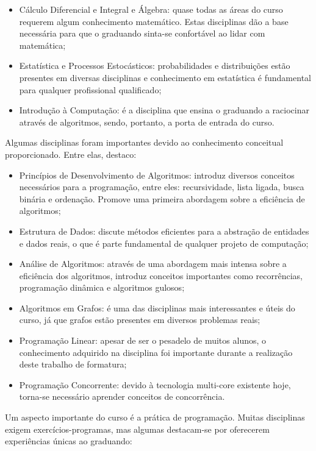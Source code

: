 \begin{itemize}
	\item Cálculo Diferencial e Integral e Álgebra: quase todas as áreas do curso requerem algum
	conhecimento matemático. Estas disciplinas dão a base necessária para que o graduando
	sinta-se confortável ao lidar com matemática;
	\item Estatística e Processos Estocásticos: probabilidades e distribuições estão presentes
	em diversas disciplinas e conhecimento em estatística é fundamental para qualquer
	profissional qualificado;
	\item Introdução à Computação: é a disciplina que ensina o graduando a raciocinar através
	de algoritmos, sendo, portanto, a porta de entrada do curso.
\end{itemize}

Algumas disciplinas foram importantes devido ao conhecimento conceitual proporcionado. Entre elas,
destaco:

\begin{itemize}
	\item Princípios de Desenvolvimento de Algoritmos: introduz diversos conceitos necessários
	para a programação, entre eles: recursividade, lista ligada, busca binária e ordenação.
	Promove uma primeira abordagem sobre a eficiência de algoritmos;
	\item Estrutura de Dados: discute métodos eficientes para a abstração de entidades e dados
	reais, 	o que é parte fundamental de qualquer projeto de computação;
	\item Análise de Algoritmos: através de uma abordagem mais intensa sobre a eficiência dos
	algoritmos, introduz conceitos importantes como recorrências, programação dinâmica e
	algoritmos gulosos;
	\item Algoritmos em Grafos: é uma das disciplinas mais interessantes e úteis do curso, já
	que grafos estão presentes em diversos problemas reais;
	\item Programação Linear: apesar de ser o pesadelo de muitos alunos, o conhecimento
	adquirido na disciplina foi importante durante a realização deste trabalho de formatura;
	\item Programação Concorrente: devido à tecnologia multi-core existente hoje, torna-se
	necessário aprender conceitos de concorrência.
\end{itemize}

Um aspecto importante do curso é a prática de programação. Muitas disciplinas exigem
exercícios-programas, mas algumas destacam-se por oferecerem experiências únicas ao graduando:

